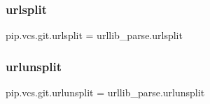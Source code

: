 \subsubsection{\texorpdfstring{urlsplit}{urlsplit}}
{\footnotesize\ttfamily pip.\+vcs.\+git.\+urlsplit = urllib\+\_\+parse.\+urlsplit}

\mbox{\label{namespacepip_1_1vcs_1_1git_a890c46e2e96bebe9df6c1394d88a3b4a}} 
\subsubsection{\texorpdfstring{urlunsplit}{urlunsplit}}
{\footnotesize\ttfamily pip.\+vcs.\+git.\+urlunsplit = urllib\+\_\+parse.\+urlunsplit}

